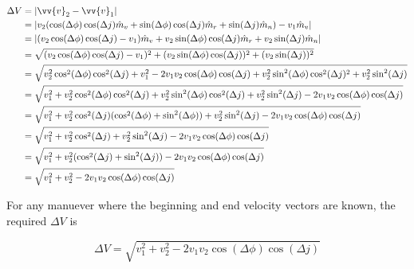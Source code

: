 \documentclass[../main.tex]{subfiles}
\begin{document}
\begin{align*}
    \Delta V & = |\vv{v}_2-\vv{v}_1|                                                                                                                                           \\
             & = |v_2(\cos(\Delta \phi)\cos(\Delta j)\hat{m}_v+\sin(\Delta \phi)\cos(\Delta j)\hat{m}_r+\sin(\Delta j)\hat{m}_n)-v_1\hat{m}_v|                                 \\
             & = |(v_2\cos(\Delta \phi)\cos(\Delta j)-v_1)\hat{m}_v+v_2\sin(\Delta \phi)\cos(\Delta j)\hat{m}_r+v_2\sin(\Delta j)\hat{m}_n|                                    \\
             & = \sqrt{(v_2\cos(\Delta \phi)\cos(\Delta j)-v_1)^2+(v_2\sin(\Delta \phi)\cos(\Delta j))^2+(v_2\sin(\Delta j))^2}                                                \\
             & = \sqrt{v_2^2\cos^2(\Delta \phi)\cos^2(\Delta j)+v_1^2-2v_1v_2\cos(\Delta \phi)\cos(\Delta j)+v_2^2\sin^2(\Delta \phi)\cos^2(\Delta j)^2+v_2^2\sin^2(\Delta j)} \\
             & = \sqrt{v_1^2+v_2^2\cos^2(\Delta \phi)\cos^2(\Delta j)+v_2^2\sin^2(\Delta \phi)\cos^2(\Delta j)+v_2^2\sin^2(\Delta j)-2v_1v_2\cos(\Delta \phi)\cos(\Delta j)}   \\
             & = \sqrt{v_1^2+v_2^2\cos^2(\Delta j)(\cos^2(\Delta \phi)+\sin^2(\Delta \phi))+v_2^2\sin^2(\Delta j)-2v_1v_2\cos(\Delta \phi)\cos(\Delta j)}                      \\
             & = \sqrt{v_1^2+v_2^2\cos^2(\Delta j)+v_2^2\sin^2(\Delta j)-2v_1v_2\cos(\Delta \phi)\cos(\Delta j)}                                                               \\
             & = \sqrt{v_1^2+v_2^2(\cos^2(\Delta j)+\sin^2(\Delta j))-2v_1v_2\cos(\Delta \phi)\cos(\Delta j)}                                                                  \\
             & = \sqrt{v_1^2+v_2^2-2v_1v_2\cos(\Delta \phi)\cos(\Delta j)}                                                                                                     \\
\end{align*}

For any manuever where the beginning and end velocity vectors are known, the required $\Delta V$ is

\begin{equation}
    \Delta V = \sqrt{v_1^2+v_2^2-2v_1v_2\cos(\Delta \phi)\cos(\Delta j)}
\end{equation}
\end{document}
